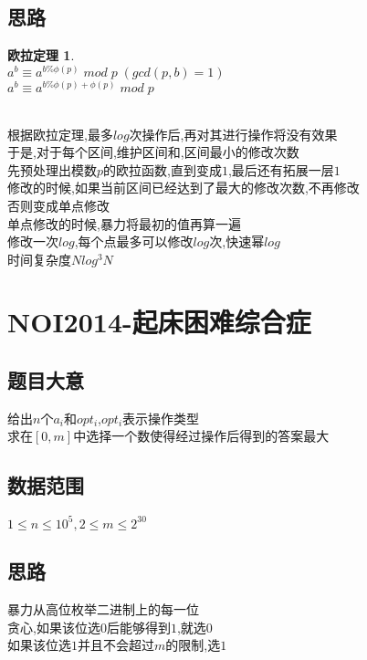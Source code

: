 \documentclass{ctexart}
\numberwithin{equation}{section}
\newtheorem{problem}{欧拉定理}
\begin{document}
\begin{flushleft}
  \subsection{思路}
  \begin{problem}
    ~\\
    $a^b \equiv a^{b\% \phi(p)}\; mod \; p\; (gcd(p,b)=1)$\\
    $a^b \equiv a^{b\% \phi(p)+\phi(p)}\; mod\; p$\\
    ~\\
  \end{problem}
  根据欧拉定理,最多$log$次操作后,再对其进行操作将没有效果\\
  于是,对于每个区间,维护区间和,区间最小的修改次数\\
  先预处理出模数$p$的欧拉函数,直到变成$1$,最后还有拓展一层$1$\\
  修改的时候,如果当前区间已经达到了最大的修改次数,不再修改\\
  否则变成单点修改\\
  单点修改的时候,暴力将最初的值再算一遍\\
  修改一次$log$,每个点最多可以修改$log$次,快速幂$log$\\
  时间复杂度$Nlog^3N$\\
  \newpage

  \section{NOI2014-起床困难综合症}
  \subsection{题目大意}
  给出$n$个$a_i$和$opt_i$,$opt_i$表示操作类型\\
  求在$[0,m]$中选择一个数使得经过操作后得到的答案最大\\
  \subsection{数据范围}
  $1\le n\le 10^5, 2\le m\le 2^{30}$\\
  \subsection{思路}
  暴力从高位枚举二进制上的每一位\\
  贪心,如果该位选$0$后能够得到$1$,就选$0$\\
  如果该位选$1$并且不会超过$m$的限制,选$1$\\
  \newpage


\end{flushleft}
\end{document}
